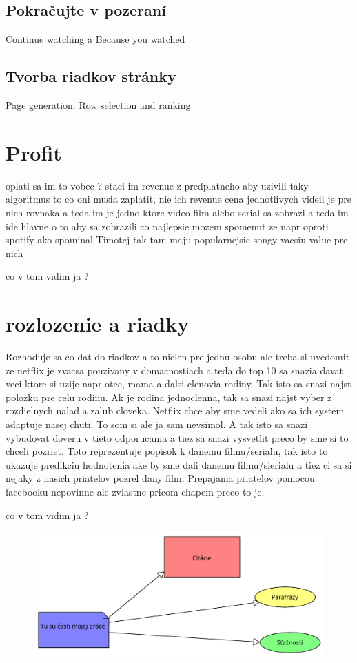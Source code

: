 \documentclass[10pt,twoside,slovak,a4paper]{article}
\begin{document}
\subsection{Pokračujte v pozeraní}
Continue watching a Because you watched
\subsection{Tvorba riadkov stránky}
Page generation: Row selection and ranking

\section{Profit}
oplati sa im to vobec ? staci im revenue z predplatneho aby uzivili taky algoritmus
to co oni musia zaplatit, nie ich revenue cena jednotlivych videii je pre nich rovnaka a teda im je jedno ktore video film alebo serial sa zobrazi a teda im ide hlavne o to aby sa zobrazili co najlepsie \cite{amatriain2015recommender}
mozem spomenut ze napr oproti spotify ako spominal Timotej tak tam maju popularnejsie songy vacsiu value pre nich

co v tom vidim ja ?

\section{rozlozenie a riadky} %
Rozhoduje sa co dat do riadkov a to nielen pre jednu osobu ale treba si uvedomit ze netflix je zvacsa pouzivany v domacnostiach a teda do top 10 sa snazia davat veci ktore si uzije napr otec, mama a dalsi clenovia rodiny. Tak isto sa snazi najst polozku pre celu rodinu. Ak je rodina jednoclenna, tak sa snazi najst vyber z rozdielnych nalad a zalub cloveka.\cite{amatriain2015recommender}
Netflix chce aby sme vedeli ako sa ich system adaptuje nasej chuti. To som si ale ja sam nevsimol. A tak isto sa snazi vybudovat doveru v tieto odporucania a tiez sa snazi vysvetlit preco by sme si to chceli pozriet. Toto reprezentuje popisok k danemu filmu/serialu, tak isto to ukazuje predikciu hodnotenia ake by sme dali danemu filmu/sierialu a tiez ci sa si nejaky z nasich priatelov pozrel dany film.
Prepajania priatelov pomocou facebooku nepovinne ale zvlastne pricom chapem preco to je.

co v tom vidim ja ?



\begin{figure}
	\includegraphics[scale=0.4]{diagram horizontal.pdf}
\end{figure}
\end{document}
